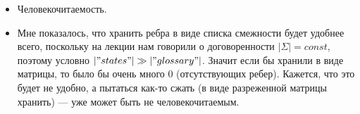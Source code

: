 \documentclass{article}
\begin{document}
\begin{enumerate}
\begin{itemize}
	\item Человекочитаемость.
	
	\item Мне показалось, что хранить ребра в виде списка смежности будет удобнее всего, поскольку на лекции нам говорили о договоренности $|\Sigma| = const$, поэтому условно $|"states"| \gg |"glossary"|$. Значит если бы хранили в виде матрицы, то было бы очень много 0 (отсутствующих ребер). Кажется, что это будет не удобно, а пытаться как-то сжать (в виде разреженной матрицы хранить) --- уже может быть не человекочитаемым.

\end{itemize}

\end{enumerate}




	
\end{document}
